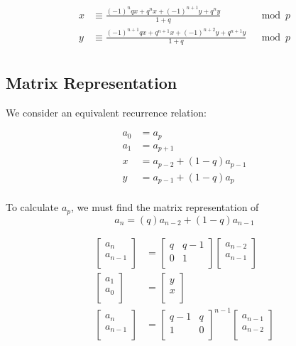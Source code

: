 \documentclass[paper.tex]{subfiles}
\begin{document}
\begin{align*}
	x &\equiv \frac{(-1)^nqx+q^nx+(-1)^{n+1}y+q^ny}{1+q} & \mod{p} \\
	y &\equiv \frac{(-1)^{n+1}qx+q^{n+1}x+(-1)^{n+2}y+q^{n+1}y}{1+q} & \mod{p} \\
\end{align*}

\subsection{Matrix Representation}

We consider an equivalent recurrence relation:

\begin{align*}
	a_{0} &= a_{p} \\
	a_{1} &= a_{p+1} \\
	x &= a_{p-2} + (1-q)a_{p-1} \\
	y &= a_{p-1} + (1-q)a_{p} \\
\end{align*}

To calculate $a_{p}$, we must find the matrix representation of 
$$ a_{n} = (q)a_{n-2} + (1-q)a_{n-1} $$

\begin{align*}
\left[ \begin{array}{ccc}
a_{n} \\
a_{n-1} \\
\end{array} \right] 
&=
\left[ \begin{array}{ccc}
q & q-1 \\
0 & 1 \\
\end{array} \right]
\left[ \begin{array}{ccc}
 a_{n-2}\\
a_{n-1} \\
\end{array} \right] \\
\left[ \begin{array}{ccc}
a_{1} \\
a_{0} \\
\end{array} \right] 
&=
\left[ \begin{array}{ccc}
y \\
x \\
\end{array} \right] \\
\left[ \begin{array}{ccc}
a_{n} \\
a_{n-1} \\
\end{array} \right] 
&=
\left[ \begin{array}{ccc}
q-1 & q \\
1 & 0 \\
\end{array} \right] ^{n-1}
\left[ \begin{array}{ccc}
 a_{n-1}\\
a_{n-2} \\
\end{array} \right]
\end{align*}
\end{document}
